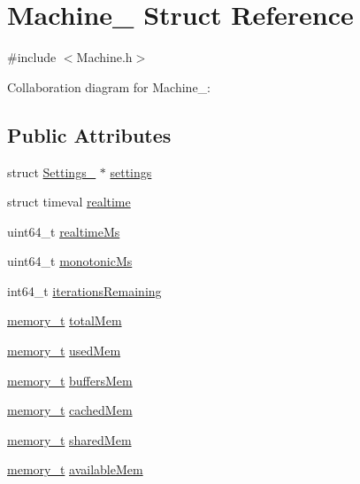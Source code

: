 \hypertarget{structMachine__}{}\section{Machine\+\_\+ Struct Reference}
\label{structMachine__}


{\ttfamily \#include $<$Machine.\+h$>$}



Collaboration diagram for Machine\+\_\+\+:
\subsection*{Public Attributes}
\begin{DoxyCompactItemize}
\item 
struct \hyperlink{structSettings__}{Settings\+\_\+} $\ast$ \hyperlink{structMachine___a2a1696949a2e3af5b1a5a48baa5704ce}{settings}
\item 
struct timeval \hyperlink{structMachine___a39a6fb546ded538c86890737de23128b}{realtime}
\item 
uint64\+\_\+t \hyperlink{structMachine___ad170ee7353420eadbab452472555d6de}{realtime\+Ms}
\item 
uint64\+\_\+t \hyperlink{structMachine___aecba871335bdaf92c256f64937ae605d}{monotonic\+Ms}
\item 
int64\+\_\+t \hyperlink{structMachine___ad341c18951a973f17011ea699df1b580}{iterations\+Remaining}
\item 
\hyperlink{Machine_8h_ac8c2c5995f64727051f4034a810e5b07}{memory\+\_\+t} \hyperlink{structMachine___a2c07a41b406022756e37ec53ea674900}{total\+Mem}
\item 
\hyperlink{Machine_8h_ac8c2c5995f64727051f4034a810e5b07}{memory\+\_\+t} \hyperlink{structMachine___a4ea930fbf9a49f8db13597a7af6d7320}{used\+Mem}
\item 
\hyperlink{Machine_8h_ac8c2c5995f64727051f4034a810e5b07}{memory\+\_\+t} \hyperlink{structMachine___a7a2b5e5d2f9cb00188c99e78fa50de61}{buffers\+Mem}
\item 
\hyperlink{Machine_8h_ac8c2c5995f64727051f4034a810e5b07}{memory\+\_\+t} \hyperlink{structMachine___a0aeb16026c3e3c4745bddaa0f2ef8f03}{cached\+Mem}
\item 
\hyperlink{Machine_8h_ac8c2c5995f64727051f4034a810e5b07}{memory\+\_\+t} \hyperlink{structMachine___aae0c722e7da966963e4cf0a01c173987}{shared\+Mem}
\item 
\hyperlink{Machine_8h_ac8c2c5995f64727051f4034a810e5b07}{memory\+\_\+t} \hyperlink{structMachine___ad48aa4e8bb17977becfae0348dd0c1ca}{available\+Mem}

\end{DoxyCompactItemize}
